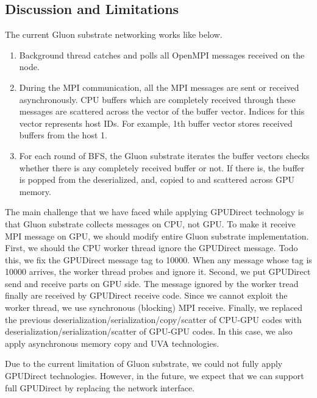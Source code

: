\subsection{Discussion and Limitations}
The current Gluon substrate networking works like below.
\begin{enumerate}
\item Background thread catches and polls all OpenMPI messages received on the node.
\item During the MPI communication, all the MPI messages are sent or received asynchronously.
CPU buffers which are completely received through these messages are scattered across the vector of the buffer vector.
Indices for this vector represents host IDs. For example, 1th buffer vector stores received buffers from the host 1.
\item For each round of BFS, the Gluon substrate iterates the buffer vectors checks whether there is any completely received buffer or not.
If there is, the buffer is popped from the deserialized, and, copied to and scattered across GPU memory. 
\end{enumerate}
The main challenge that we have faced while applying GPUDirect technology is that Gluon substrate collects messages on CPU, not GPU. 
To make it receive MPI message on GPU, we should modify entire Gluon substrate implementation.
First, we should the CPU worker thread ignore the GPUDirect message. 
Todo this, we fix the GPUDirect message tag to 10000. 
When any message whose tag is 10000 arrives, the worker thread probes and ignore it.
Second, we put GPUDirect send and receive parts on GPU side. 
The message ignored by the worker tread finally are received by GPUDirect receive code.
Since we cannot exploit the worker thread, we use synchronous (blocking) MPI receive.
Finally, we replaced the previous deserialization/serialization/copy/scatter of CPU-GPU codes with 
deserialization/serialization/scatter of GPU-GPU codes. In this case, we also apply asynchronous memory copy 
and UVA technologies.

Due to the current limitation of Gluon substrate, 
we could not fully apply GPUDirect technologies.
However, in the future, we expect that we can support full GPUDirect by replacing the network interface. 










